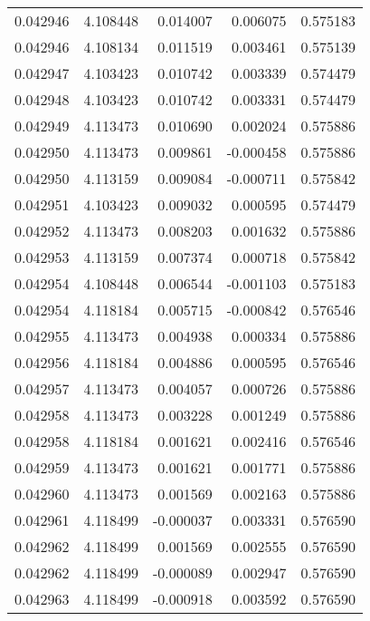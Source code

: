 \begin{tabular}{lrrrr}
0.042946    &  4.108448 &  0.014007 &  0.006075 &             0.575183 \\
0.042946    &  4.108134 &  0.011519 &  0.003461 &             0.575139 \\
0.042947    &  4.103423 &  0.010742 &  0.003339 &             0.574479 \\
0.042948    &  4.103423 &  0.010742 &  0.003331 &             0.574479 \\
0.042949    &  4.113473 &  0.010690 &  0.002024 &             0.575886 \\
0.042950    &  4.113473 &  0.009861 & -0.000458 &             0.575886 \\
0.042950    &  4.113159 &  0.009084 & -0.000711 &             0.575842 \\
0.042951    &  4.103423 &  0.009032 &  0.000595 &             0.574479 \\
0.042952    &  4.113473 &  0.008203 &  0.001632 &             0.575886 \\
0.042953    &  4.113159 &  0.007374 &  0.000718 &             0.575842 \\
0.042954    &  4.108448 &  0.006544 & -0.001103 &             0.575183 \\
0.042954    &  4.118184 &  0.005715 & -0.000842 &             0.576546 \\
0.042955    &  4.113473 &  0.004938 &  0.000334 &             0.575886 \\
0.042956    &  4.118184 &  0.004886 &  0.000595 &             0.576546 \\
0.042957    &  4.113473 &  0.004057 &  0.000726 &             0.575886 \\
0.042958    &  4.113473 &  0.003228 &  0.001249 &             0.575886 \\
0.042958    &  4.118184 &  0.001621 &  0.002416 &             0.576546 \\
0.042959    &  4.113473 &  0.001621 &  0.001771 &             0.575886 \\
0.042960    &  4.113473 &  0.001569 &  0.002163 &             0.575886 \\
0.042961    &  4.118499 & -0.000037 &  0.003331 &             0.576590 \\
0.042962    &  4.118499 &  0.001569 &  0.002555 &             0.576590 \\
0.042962    &  4.118499 & -0.000089 &  0.002947 &             0.576590 \\
0.042963    &  4.118499 & -0.000918 &  0.003592 &             0.576590 \\

\end{tabular}
